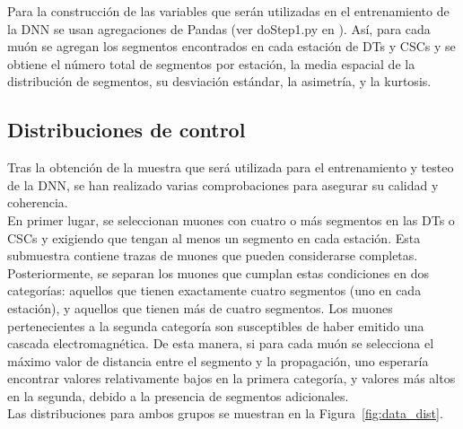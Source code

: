 Para la construcci\'on de las variables que ser\'an utilizadas en el entrenamiento de la DNN se usan agregaciones de Pandas (ver doStep1.py en \cite{processor}). As\'i, para cada mu\'on se agregan los segmentos encontrados en cada estaci\'on de DTs y CSCs y se obtiene el n\'umero total de segmentos por estaci\'on, la media espacial de la distribuci\'on de segmentos, su desviaci\'on est\'andar, la asimetr\'ia, y la kurtosis.



\subsection{Distribuciones de control}\label{sec:plots}

Tras la obtenci\'on de la muestra que ser\'a utilizada para el entrenamiento y testeo de la DNN, se han realizado varias comprobaciones para asegurar su calidad y coherencia. \\

En primer lugar, se seleccionan muones con cuatro o m\'as segmentos en las DTs o CSCs y exigiendo que tengan al menos un segmento en cada estaci\'on. Esta submuestra contiene trazas de muones que pueden considerarse completas. Posteriormente, se separan los muones que cumplan estas condiciones en dos categor\'ias: aquellos que tienen exactamente cuatro segmentos (uno en cada estaci\'on), y aquellos que tienen m\'as de cuatro segmentos. Los muones pertenecientes a la segunda categor\'ia son susceptibles de haber emitido una cascada electromagn\'etica. De esta manera, si para cada mu\'on se selecciona el m\'aximo valor de distancia entre el segmento y la propagaci\'on, uno esperar\'ia encontrar valores relativamente bajos en la primera categor\'ia, y valores m\'as altos en la segunda, debido a la presencia de segmentos adicionales. \\
Las distribuciones para ambos grupos se muestran en la Figura~\ref{fig:data_dist}. \\

